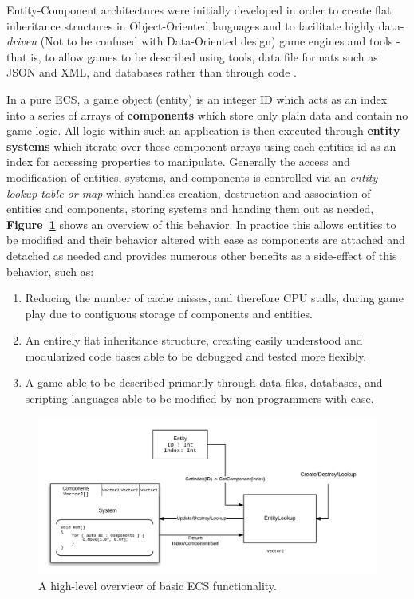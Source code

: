 \documentclass[10pt]{scrartcl}
\begin{document}
	Entity-Component architectures were initially developed in order to create flat inheritance structures in Object-Oriented languages and to facilitate highly data-\textit{driven} (Not to be confused with Data-Oriented design) game engines and tools - that is, to allow games to be described using tools, data file formats such as JSON and XML, and databases rather than through code \parencite{thief}.
	\par
	In a pure ECS, a game object (entity) is an integer ID which acts as an index into a series of arrays of \textbf{components} which store only plain data and contain no game logic. All logic within such an application is then executed through \textbf{entity systems} which iterate over these component arrays using each entities id as an index for accessing properties to manipulate. Generally the access and modification of entities, systems, and components is controlled via an \textit{entity lookup table or map} which handles creation, destruction and association of entities and components, storing systems and handing them out as needed, \textbf{Figure~\ref{fig:ecsbasic}} shows an overview of this behavior. In practice this allows entities to be modified and their behavior altered with ease as components are attached and detached as needed and provides numerous other benefits as a side-effect of this behavior, such as:
	\begin{enumerate}
		\item Reducing the number of cache misses, and therefore CPU stalls, during game play due to contiguous storage of components and entities.
		\item An entirely flat inheritance structure, creating easily understood and modularized code bases able to be debugged and tested more flexibly.
		\item A game able to be described primarily through data files, databases, and scripting languages able to be modified by non-programmers with ease.
	\end{enumerate}

	\begin{figure}[H]
		\centering
		\includegraphics[width=\textwidth]{models/ecsdiagram.png}
		\caption{A high-level overview of basic ECS functionality.}
		\label{fig:ecsbasic}
	\end{figure}
\end{document}
